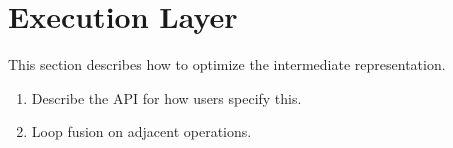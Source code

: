 \section{Execution Layer}
This section describes how to optimize the intermediate representation.
\begin{enumerate}
    \item Describe the API for how users specify this.
    \item Loop fusion on adjacent operations.
\end{enumerate}